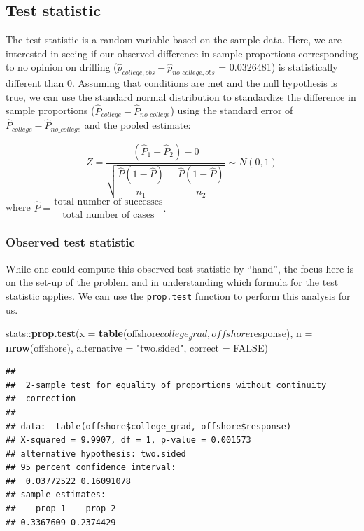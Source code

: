 \documentclass[]{tufte-book}
\newenvironment{Shaded}{\begin{snugshade}}{\end{snugshade}}
\newcommand{\KeywordTok}[1]{\textcolor[rgb]{0.13,0.29,0.53}{\textbf{{#1}}}}
\newcommand{\DataTypeTok}[1]{\textcolor[rgb]{0.13,0.29,0.53}{{#1}}}
\newcommand{\StringTok}[1]{\textcolor[rgb]{0.31,0.60,0.02}{{#1}}}
\newcommand{\OtherTok}[1]{\textcolor[rgb]{0.56,0.35,0.01}{{#1}}}
\newcommand{\NormalTok}[1]{{#1}}
\begin{document}
\subsection{Test statistic}\label{test-statistic-2}

The test statistic is a random variable based on the sample data. Here,
we are interested in seeing if our observed difference in sample
proportions corresponding to no opinion on drilling
(\(\hat{p}_{college, obs} - \hat{p}_{no\_college, obs}\) = 0.0326481) is
statistically different than 0. Assuming that conditions are met and the
null hypothesis is true, we can use the standard normal distribution to
standardize the difference in sample proportions
(\(\hat{P}_{college} - \hat{P}_{no\_college}\)) using the standard error
of \(\hat{P}_{college} - \hat{P}_{no\_college}\) and the pooled
estimate:

\[ Z =\dfrac{ (\hat{P}_1 - \hat{P}_2) - 0}{\sqrt{\dfrac{\hat{P}(1 - \hat{P})}{n_1} + \dfrac{\hat{P}(1 - \hat{P})}{n_2} }} \sim N(0, 1) \]
where
\(\hat{P} = \dfrac{\text{total number of successes} }{ \text{total number of cases}}.\)

\subsubsection{Observed test statistic}\label{observed-test-statistic-2}

While one could compute this observed test statistic by ``hand'', the
focus here is on the set-up of the problem and in understanding which
formula for the test statistic applies. We can use the
\texttt{prop.test} function to perform this analysis for us.

\begin{Shaded}
\begin{Highlighting}[]
\NormalTok{stats::}\KeywordTok{prop.test}\NormalTok{(}\DataTypeTok{x =} \KeywordTok{table}\NormalTok{(offshore$college_grad, offshore$response),}
       \DataTypeTok{n =} \KeywordTok{nrow}\NormalTok{(offshore),}
       \DataTypeTok{alternative =} \StringTok{"two.sided"}\NormalTok{,}
       \DataTypeTok{correct =} \OtherTok{FALSE}\NormalTok{)}
\end{Highlighting}
\end{Shaded}

\begin{verbatim}
## 
##  2-sample test for equality of proportions without continuity
##  correction
## 
## data:  table(offshore$college_grad, offshore$response)
## X-squared = 9.9907, df = 1, p-value = 0.001573
## alternative hypothesis: two.sided
## 95 percent confidence interval:
##  0.03772522 0.16091078
## sample estimates:
##    prop 1    prop 2 
## 0.3367609 0.2374429
\end{verbatim}
\end{document}
